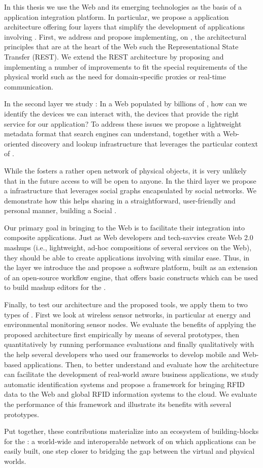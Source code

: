 In this thesis we use the Web and its emerging technologies as the basis of a \sts{} application integration platform. In particular, we propose a \WoTLong{} application architecture offering four layers that simplify the development of applications involving \sts{}. First, we address  and propose implementing, on \sts{}, the architectural principles that are at the heart of the Web such the Representational State Transfer (REST). We extend the REST architecture by proposing and implementing a number of improvements to fit the special requirements of the physical world such as the need for domain-specific proxies or real-time communication. 

In the second layer we study : In a Web populated by billions of \sts{}, how can we identify the devices we can interact with, the devices that provide the right service for our application? To address these issues we propose a lightweight metadata format that search engines can understand, together with a Web-oriented discovery and lookup infrastructure that leverages the particular context of \sts{}. 

While the \WoTLong{} fosters a rather open network of physical objects, it is very unlikely that in the future access to \sts{} will be open to anyone. In the third layer we propose a  infrastructure that leverages social graphs encapsulated by social networks. We demonstrate how this helps sharing \sts{} in a straightforward, user-friendly and personal manner, building a Social \WoTLong{}.

Our primary goal in bringing \sts{} to the Web is to facilitate their integration into composite applications. Just as Web developers and tech-savvies create Web 2.0 mashups (i.e., lightweight, ad-hoc compositions of several services on the Web), they should be able to create applications involving \sts{} with similar ease. Thus, in the  layer we introduce the  and propose a software platform, built as an extension of an open-source workflow engine, that offers basic constructs which can be used to build mashup editors for the \WoTLong{}. 

Finally, to test our architecture and the proposed tools, we apply them to two types of \sts{}. First we look at wireless sensor networks, in particular at energy and environmental monitoring sensor nodes. We evaluate the benefits of applying the proposed architecture first empirically by means of several prototypes, then quantitatively by running performance evaluations and finally qualitatively with the help several developers who used our frameworks to develop mobile and Web-based applications. Then, to better understand and evaluate how the \WoTLong{} architecture can facilitate the development of real-world aware business applications, we study automatic identification systems and propose a framework for bringing RFID data to the Web and global RFID information systems to the cloud. We evaluate the performance of this framework and illustrate its benefits with several prototypes.

Put together, these contributions materialize into an ecosystem of building-blocks for the \WoTLong{}: a world-wide and interoperable network of \sts{} on which applications can be easily built, one step closer to bridging the gap between the virtual and physical worlds.
